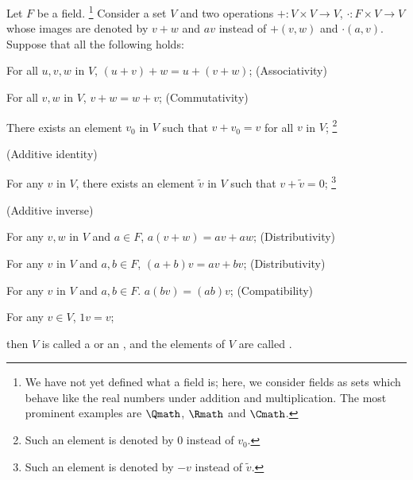 \begin{definition}
    \label{def:vectorspace}
    Let \(F\) be a field.%
    \footnote{We have not yet defined what a field is;
    here, we consider fields as sets which behave like the real numbers
    under addition and multiplication.
    The most prominent examples are
    \(\Qmath\), \(\Rmath\) and \(\Cmath\).}
    Consider a set \(V\) and two operations
    \(+:V\times V\to V\), \(\cdot:F\times V\to V\)
    whose images are denoted by \(v+w\) and \(av\)
    instead of \(+(v,w)\) and \(\cdot(a,v)\).
    Suppose that all the following holds:
    \begin{axioms}[Vsp]
        \item For all \(u,v,w\) in \(V\), \((u+v)+w=u+(v+w)\);
        \hfill\textsf{(Associativity)}

        \item For all \(v,w\) in \(V\), \(v+w=w+v\);
        \hfill\textsf{(Commutativity)}

        \item There exists an element \(v_0\) in \(V\) such that
        \(v+v_0=v\) for all \(v\) in \(V\);%
        \footnote{
            Such an element is denoted by \(0\)
            instead of \(v_0\).}

        \hfill\textsf{(Additive identity)}

        \item For any \(v\) in \(V\),
        there exists an element \(\tilde v\) in \(V\) such that
        \(v+\tilde v=0\);%
        \footnote{
            Such an element is denoted by \(-v\)
            instead of \(\tilde v\).}

        \hfill\textsf{(Additive inverse)}

        \item For any \(v,w\) in \(V\) and \(a\in F\),
        \(a(v+w)=av+aw\);
        \hfill\textsf{(Distributivity)}

        \item For any \(v\) in \(V\) and \(a,b\in F\),
        \((a+b)v=av+bv\);
        \hfill\textsf{(Distributivity)}

        \item For any \(v\) in \(V\) and \(a,b\in F\).
        \(a(bv)=(ab)v\);
        \hfill\textsf{(Compatibility)}

        \item For any \(v\in V\), \(1v=v\);
    \end{axioms}
    then \(V\) is called
    a 
    or an ,
    and the elements of \(V\) are called
    .
\end{definition}

